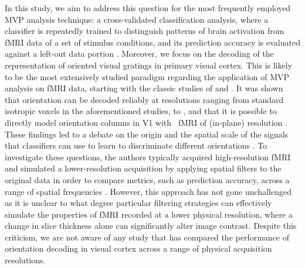 In this study, we aim to address this question for the most frequently employed
MVP analysis technique: a cross-validated classification analysis, where a
classifier is repeatedly trained to distinguish patterns of brain activation
from fMRI data of a set of stimulus conditions, and its prediction accuracy is
evaluated against a left-out data portion \citep{pereira_2009}. Moreover, we
focus on the decoding of the representation of oriented visual gratings in
primary visual cortex. This is likely to be the most extensively studied
paradigm regarding the application of MVP analysis on fMRI data, starting with
the classic studies of  \citet{kamitani_2005} and \citet{haynes_2005}. It was
shown that orientation can be decoded reliably at resolutions ranging from
standard  isotropic voxels in the aforementioned studies, to 
\citep{swisher_2010}, and that it is possible to directly model orientation
columns in V1 with \sevenT\ fMRI of  (in-plane) resolution
\citep{yacoub_2008,ugurbil_2012}. These findings led to a debate on the origin
and the spatial scale of the signals that classifiers can use to learn to
discriminate different orientations
\citep{opdebeeck_2010,swisher_2010,alink_2013,freeman_2013}. To investigate
these questions, the authors typically acquired high-resolution fMRI and
simulated a lower-resolution acquisition by applying spatial filters to the
original data in order to compare metrics, such as prediction accuracy, across
a range of spatial frequencies \citep[see][]{swisher_2010}.  However, this
approach has not gone unchallenged as it is unclear to what degree particular
filtering strategies \citep[e.g. Gaussian filtering vs. low-pass filtering in
the spatial frequency domain, see][]{misaki_2013} can effectively simulate the
properties of fMRI recorded at a lower physical resolution, where a change in
slice thickness alone can significantly alter image contrast. Despite this
criticism, we are not aware of any study that has compared the performance of
orientation decoding in visual cortex across a range of physical acquisition
resolutions.

